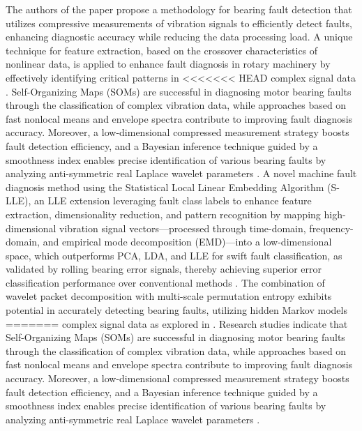\documentclass[sn-basic,pdflatex]{sn-jnl}
\theoremstyle{remark}
\theoremstyle{definition}
\begin{document}
The authors of the paper \citet{WOS:000335959500009} propose a
methodology for bearing fault detection that utilizes compressive
measurements of vibration signals to efficiently detect faults,
enhancing diagnostic accuracy while reducing the data processing load. A
unique technique for feature extraction, based on the crossover
characteristics of nonlinear data, is applied to enhance fault diagnosis
in rotary machinery by effectively identifying critical patterns in
<<<<<<< HEAD
complex signal data \citep{WOS:000338603900013}. Self-Organizing Maps
(SOMs) are successful in diagnosing motor bearing faults through the
classification of complex vibration data, while approaches based on fast
nonlocal means and envelope spectra contribute to improving fault
diagnosis accuracy. Moreover, a low-dimensional compressed measurement
strategy boosts fault detection efficiency, and a Bayesian inference
technique guided by a smoothness index enables precise identification of
various bearing faults by analyzing anti-symmetric real Laplace wavelet
parameters
\citep{WOS:000380543400119, WOS:000348309400067, WOS:000354607100016, WOS:000350998800016}.
A novel machine fault diagnosis method using the Statistical Local
Linear Embedding Algorithm (S-LLE), an LLE extension leveraging fault
class labels to enhance feature extraction, dimensionality reduction,
and pattern recognition by mapping high-dimensional vibration signal
vectors---processed through time-domain, frequency-domain, and empirical
mode decomposition (EMD)---into a low-dimensional space, which
outperforms PCA, LDA, and LLE for swift fault classification, as
validated by rolling bearing error signals, thereby achieving superior
error classification performance over conventional methods
\citep{WOS:000361788200068}. The combination of wavelet packet
decomposition with multi-scale permutation entropy exhibits potential in
accurately detecting bearing faults, utilizing hidden Markov models
=======
complex signal data as explored in \citep{WOS:000338603900013}. Research
studies indicate that Self-Organizing Maps (SOMs) are successful in
diagnosing motor bearing faults through the classification of complex
vibration data, while approaches based on fast nonlocal means and
envelope spectra contribute to improving fault diagnosis accuracy.
Moreover, a low-dimensional compressed measurement strategy boosts fault
detection efficiency, and a Bayesian inference technique guided by a
smoothness index enables precise identification of various bearing
faults by analyzing anti-symmetric real Laplace wavelet parameters
\citep[@WOS:000348309400067, @WOS:000354607100016, @WOS:000350998800016]{WOS:000380543400119}.
\end{document}
